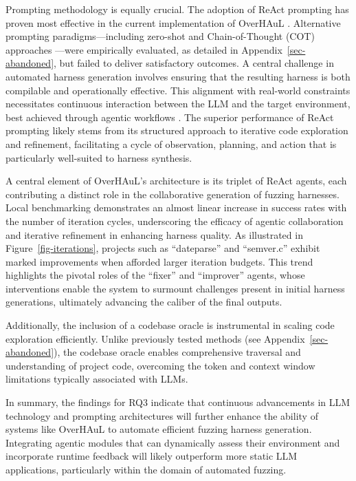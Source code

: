 \documentclass[
  a4paper,
]{scrreprt}
\theoremstyle{definition}
\theoremstyle{remark}
\begin{document}
Prompting methodology is equally crucial. The adoption of ReAct
prompting has proven most effective in the current implementation of
OverHAuL \autocite{reAct}. Alternative prompting paradigms---including
zero-shot and Chain-of-Thought (COT) approaches
\autocite{chainofthought}---were empirically evaluated, as detailed in
Appendix~\ref{sec-abandoned}, but failed to deliver satisfactory
outcomes. A central challenge in automated harness generation involves
ensuring that the resulting harness is both compilable and operationally
effective. This alignment with real-world constraints necessitates
continuous interaction between the LLM and the target environment, best
achieved through agentic workflows \autocite{giannone2025}. The superior
performance of ReAct prompting likely stems from its structured approach
to iterative code exploration and refinement, facilitating a cycle of
observation, planning, and action that is particularly well-suited to
harness synthesis.

A central element of OverHAuL's architecture is its triplet of ReAct
agents, each contributing a distinct role in the collaborative
generation of fuzzing harnesses. Local benchmarking demonstrates an
almost linear increase in success rates with the number of iteration
cycles, underscoring the efficacy of agentic collaboration and iterative
refinement in enhancing harness quality. As illustrated in
Figure~\ref{fig-iterations}, projects such as ``dateparse'' and
``semver.c'' exhibit marked improvements when afforded larger iteration
budgets. This trend highlights the pivotal roles of the ``fixer'' and
``improver'' agents, whose interventions enable the system to surmount
challenges present in initial harness generations, ultimately advancing
the caliber of the final outputs.

Additionally, the inclusion of a codebase oracle is instrumental in
scaling code exploration efficiently. Unlike previously tested methods
(see Appendix~\ref{sec-abandoned}), the codebase oracle enables
comprehensive traversal and understanding of project code, overcoming
the token and context window limitations typically associated with LLMs.

In summary, the findings for RQ3 indicate that continuous advancements
in LLM technology and prompting architectures will further enhance the
ability of systems like OverHAuL to automate efficient fuzzing harness
generation. Integrating agentic modules that can dynamically assess
their environment and incorporate runtime feedback will likely
outperform more static LLM applications, particularly within the domain
of automated fuzzing.
\end{document}
